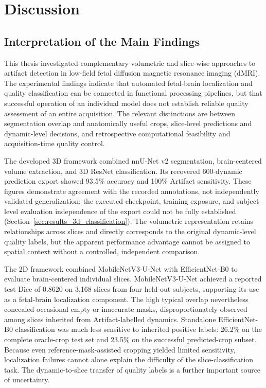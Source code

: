 \chapter{Discussion}

\section{Interpretation of the Main Findings}
\label{sec:discussion_main_findings}

This thesis investigated complementary volumetric and slice-wise approaches to artifact detection in low-field fetal diffusion magnetic resonance imaging (dMRI). The experimental findings indicate that automated fetal-brain localization and quality classification can be connected in functional processing pipelines, but that successful operation of an individual model does not establish reliable quality assessment of an entire acquisition. The relevant distinctions are between segmentation overlap and anatomically useful crops, slice-level predictions and dynamic-level decisions, and retrospective computational feasibility and acquisition-time quality control.

The developed 3D framework combined nnU-Net v2 segmentation, brain-centered volume extraction, and 3D ResNet classification. Its recovered 600-dynamic prediction export showed 93.5\% accuracy and 100\% Artifact sensitivity. These figures demonstrate agreement with the recorded annotations, not independently validated generalization: the executed checkpoint, training exposure, and subject-level evaluation independence of the export could not be fully established (Section~\ref{sec:results_3d_classification}). The volumetric representation retains relationships across slices and directly corresponds to the original dynamic-level quality labels, but the apparent performance advantage cannot be assigned to spatial context without a controlled, independent comparison.

The 2D framework combined MobileNetV3-U-Net with EfficientNet-B0 to evaluate brain-centered individual slices. MobileNetV3-U-Net achieved a reported test Dice of 0.8620 on 3,168 slices from four held-out subjects, supporting its use as a fetal-brain localization component. The high typical overlap nevertheless concealed occasional empty or inaccurate masks, disproportionately observed among slices inherited from Artifact-labelled dynamics. Standalone EfficientNet-B0 classification was much less sensitive to inherited positive labels: 26.2\% on the complete oracle-crop test set and 23.5\% on the successful predicted-crop subset. Because even reference-mask-assisted cropping yielded limited sensitivity, localization failures cannot alone explain the difficulty of the slice-classification task. The dynamic-to-slice transfer of quality labels is a further important source of uncertainty.

